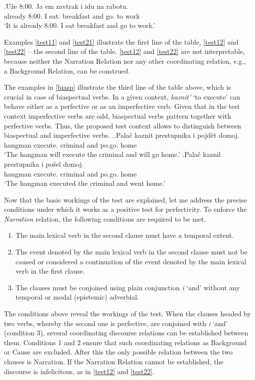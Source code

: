 \exg.\label{ex:nar:imp}U\v{z}e 8:00. Ja em\textsuperscript{\IPF} zavtrak i idu\textsuperscript{\IPF} na rabotu.\\
already 8:00. I eat. breakfast and go. to work\\
\trans `It is already 8:00. I eat breakfast and go to work.'

Examples \ref{test11} and \ref{test21} illustrate the first line of the table, \ref{test12} and \ref{test22} -- the second line of the table. \ref{test12} and \ref{test22} are not interpretable, because neither the Narration Relation nor any other coordinating relation, e.g., a Background Relation, can be construed. 

The examples in \ref{biasp} illustrate the third line of the table above, which is crucial in case of biaspectual verbs. In a given context, \textit{kaznit'} `to execute' can behave either as a perfective or as an imperfective verb. Given that in the test context imperfective verbs are odd, biaspectual verbs pattern together with perfective verbs. Thus, the proposed test context allows to distinguish between biaspectual and imperfective verbs. 
\ex.\label{biasp}\ag.Pala\v{c} kaznit prestupnika i pojd\"et\textsuperscript{\PF} domoj.\\
hangman execute. criminal and po.go. home\\
`The hangman will execute the criminal and will go home.'
\bg.Pala\v{c} kaznil prestupnika i po\v{s}el\textsuperscript{\PF} domoj.\\
hangman execute. criminal and po.go. home\\
`The hangman executed the criminal and went home.'

Now that the basic workings of the test are explained, let me address the precise conditions under which it works as a positive test for perfectivity. To enforce the \textit{Narration} relation, the following conditions are required to be met.
\begin{enumerate}
\item The main lexical verb in the second clause must have a temporal extent.
\item The event denoted by the main lexical verb in the second clause must not be caused or considered a continuation of the event denoted by the main lexical verb in the first clause.
\item The clauses must be conjoined using plain conjunction \textit{i} `and' without any temporal or modal (epistemic) adverbial.
\end{enumerate}
The conditions above reveal the workings of the test. When the clauses headed by two verbs, whereby the second one is perfective, are conjoined with \textit{i} `and' (condition 3), several coordinating discourse relations can be established between them. Conditions 1 and 2 ensure that such coordinating relations as Background or Cause are excluded. After this the only possible relation between the two clauses is Narration. If the Narration Relation  cannot be established, the discourse is infelicitous, as in \ref{test12} and \ref{test22}.

